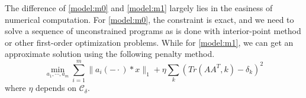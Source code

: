 \documentclass[a4paper]{article}
\begin{document}
The difference of \eqref{model:m0} and \eqref{model:m1} largely lies in the easiness of numerical computation. For \eqref{model:m0}, the constraint is exact, and we need to solve a sequence of unconstrained programs as is done with interior-point method or other first-order optimization problems. While for \eqref{model:m1}, we can get an approximate solution using the  following penalty method. 
\begin{equation}
\min_{a_1,\cdots,a_m} \sum_{i=1}^m \|a_i(-\cdot)*x\|_1 + \eta \sum_k (Tr(AA^T,k)-\delta_k)^2 
\end{equation}
where $\eta$ depends on $\mathcal{C}_\delta$.
%	
\end{document}
